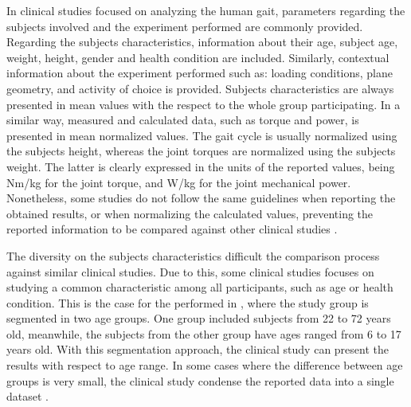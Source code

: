 In clinical studies focused on analyzing the human gait, parameters regarding the subjects involved and the experiment performed are commonly provided. Regarding the subjects characteristics, information about their age, subject age, weight, height, gender and health condition are included. Similarly, contextual information about the experiment performed such as: loading conditions, plane geometry, and activity of choice is provided. Subjects characteristics are always presented in mean values with the respect to the whole group participating. In a similar way, measured and calculated data, such as torque and power, is presented in mean normalized values. The gait cycle is usually normalized using the subjects height, whereas the joint torques are normalized using the subjects weight. The latter is clearly expressed in the units of the reported values, being Nm/kg for the joint torque, and W/kg for the joint mechanical power. Nonetheless, some studies do not follow the same guidelines when reporting the obtained results, or when normalizing the calculated values, preventing the reported information to be compared against other clinical studies \cite{lee2008biomechanics}. 

The diversity on the subjects characteristics difficult the comparison process against similar clinical studies. Due to this, some clinical studies focuses on studying a common characteristic among all participants, such as age or health condition. This is the case for the performed in \cite{bovi2011multiple}, where the study group is segmented in two age groups. One group included subjects from 22 to 72 years old, meanwhile, the subjects from the other group have ages ranged from 6 to 17 years old. With this segmentation approach, the clinical study can present the results with respect to age range. In some cases where the difference between age groups is very small, the clinical study condense the reported data into a single dataset \cite{lee2008biomechanics}.

